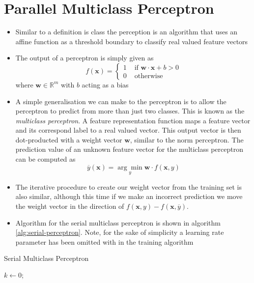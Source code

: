 \section{Parallel Multiclass Perceptron}

\begin{itemize}
    \item Similar to a definition is class the perception is an algorithm that uses an affine function as a threshold boundary to classify real valued feature vectors
    \item The output of a perceptron is simply given as
    \[
        f(\mathbf{x})=\left\{\begin{array}{ll}
        1 & \text { if } \mathbf{w} \cdot \mathbf{x}+b>0 \\
        0 & \text { otherwise }
        \end{array}\right.
    \]
    where $\bm{w} \in \mathbb{R}^{m}$ with $b$ acting as a bias
    \item A simple generalisation we can make to the perceptron is to allow the perceptron to predict from more than just two classes. This is known as the {\it multiclass perceptron}. A feature representation function maps a feature vector and its correspond label to a real valued vector. This output vector is then dot-producted with  a weight vector $\bm{w}$, similar to the norm perceptron. The prediction value of an unknown feature vector for the multiclass perceptron can be computed as
    \[
        \overline{y} \left( \bm{x} \right) = \underset{y}{\arg \min } \bm{w} \cdot f(\bm{x}, y)
    \]
    \item The iterative procedure to create our weight vector from the training set is also similar, although this time if we make an incorrect prediction we move the weight vector in the direction of $f(\bm{x}, y) - f(\bm{x}, \overline{y})$.
    \item Algorithm for the serial multiclass perceptron is shown in algorithm \ref{alg:serial-perceptron}. Note, for the sake of simplicity a learning rate parameter has been omitted with in the training algorithm
\end{itemize}
\begin{algorithm}[ht!!!]
    \caption{Serial Multiclass Perceptron}
    \label{alg:serial-perceptron}
    \SetAlgoLined
    \BlankLine
    $k \gets 0$;
    
    \BlankLine
\end{algorithm}

